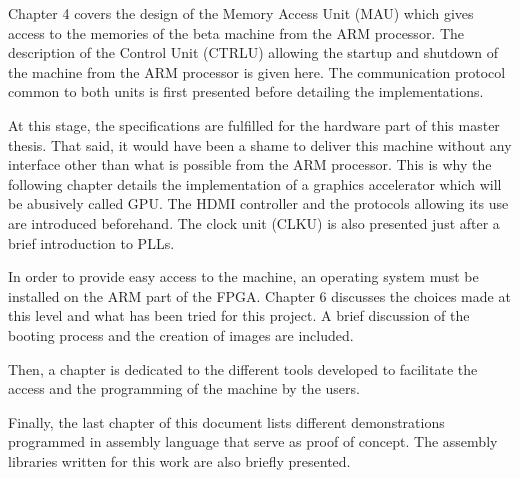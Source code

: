 Chapter 4 covers the design of the Memory Access Unit (MAU) which gives access to the memories of 
the beta machine from the ARM processor. The description of the Control Unit (CTRLU) allowing the 
startup and shutdown of the machine from the ARM processor is given here. The communication 
protocol common to both units is first presented before detailing the implementations. 

At this stage, the specifications are fulfilled for the hardware part of this master thesis. That
said, it would have been a shame to deliver this machine without any interface other than what is 
possible from the ARM processor. This is why the following chapter details the implementation of a 
graphics accelerator which will be abusively called GPU. The HDMI controller and the protocols 
allowing its use are introduced beforehand. The clock unit (CLKU) is also presented just after a 
brief introduction to PLLs.

In order to provide easy access to the machine, an operating system must be installed on the ARM 
part of the FPGA. Chapter 6 discusses the choices made at this level and what has been tried 
for this project. A brief discussion of the booting process and the creation of images are included.

Then, a chapter is dedicated to the different tools developed to facilitate the access and the 
programming of the machine by the users.

Finally, the last chapter of this document lists different demonstrations programmed in assembly language
that serve as proof of concept. The assembly libraries written for this work are also briefly 
presented.

